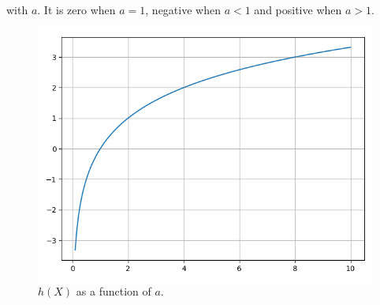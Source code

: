 \documentclass[journal,12pt,twocolumn]{IEEEtran}
\renewcommand\thesection{\arabic{section}}
\begin{document}
\begin{enumerate}[label=\thesection.\arabic*, ref=\thesection.\theenumi]
    with $a$. It is zero when $a = 1$, negative when $a < 1$ and positive when
    $a > 1$.
    \begin{figure}[!ht]
        \centering
        \includegraphics[width=\columnwidth]{figs/1_6_1.png}
        \caption{$h(X)$ as a function of $a$.}
        \label{fig:1-6-1}
    \end{figure}
\end{enumerate}
\end{document}
